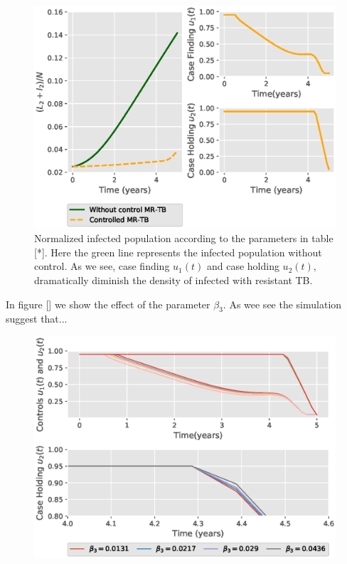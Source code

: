 \begin{figure}
  \centering
  \includegraphics[width=0.7\linewidth]{Figures/figure_1_two_strain_tbm}
  \caption{Normalized infected population according to the parameters in 
  table [*]. Here the green line represents the infected population without 
  control. As we see, case finding $u_1(t)$ and case holding $u_2(t)$, 
  dramatically diminish the density of infected with resistant TB.}
  \label{fig:figure1twostraintbm}
\end{figure}


In figure [] we show the effect of the parameter $\beta_3$. As wee see the 
simulation suggest that...

\begin{figure}
  \centering
  \includegraphics[width=0.7\linewidth]{Figures/figure_2_two_strain_tbm}
  \caption{}
  \label{fig:figure2twostraintbm}
\end{figure}

